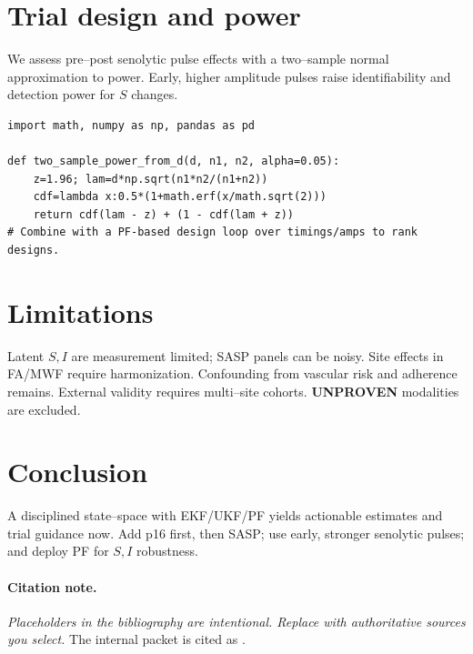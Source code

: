 \documentclass[11pt]{article}
\begin{document}
\section{Trial design and power}
We assess pre--post senolytic pulse effects with a two--sample normal approximation to power. Early, higher amplitude pulses raise identifiability and detection power for \(S\) changes.
\begin{lstlisting}
import math, numpy as np, pandas as pd

def two_sample_power_from_d(d, n1, n2, alpha=0.05):
    z=1.96; lam=d*np.sqrt(n1*n2/(n1+n2))
    cdf=lambda x:0.5*(1+math.erf(x/math.sqrt(2)))
    return cdf(lam - z) + (1 - cdf(lam + z))
# Combine with a PF-based design loop over timings/amps to rank designs.
\end{lstlisting}

\section{Limitations}
Latent \(S,I\) are measurement limited; SASP panels can be noisy. Site effects in FA/MWF require harmonization. Confounding from vascular risk and adherence remains. External validity requires multi--site cohorts. \textbf{UNPROVEN} modalities are excluded.

\section{Conclusion}
A disciplined state--space with EKF/UKF/PF yields actionable estimates and trial guidance now. Add p16 first, then SASP; use early, stronger senolytic pulses; and deploy PF for \(S,I\) robustness.

\paragraph{Citation note.} \emph{Placeholders in the bibliography are intentional. Replace with authoritative sources you select.} The internal packet is cited as \cite{UserPacket2025}.



\end{document}
